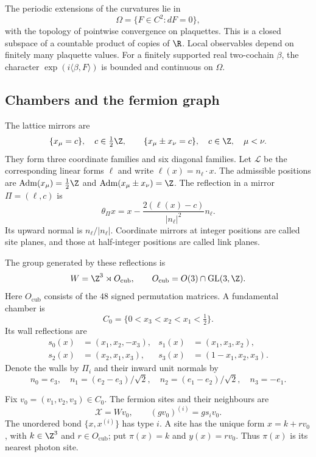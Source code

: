 The periodic extensions of the curvatures lie in
\[
 \Omega=\{F\in C^2:dF=0\},
\]
with the topology of pointwise convergence on plaquettes. This is a
closed subspace of a countable product of copies of $\R$. Local
observables depend on finitely many plaquette values. For a finitely
supported real two-cochain $\beta$, the character
$\exp(i\langle\beta,F\rangle)$ is bounded and continuous on $\Omega$.

\subsection{Chambers and the fermion graph}\label{subsec:reg-chambers}

The lattice mirrors are
\begin{equation}\label{eq:reg-mirrors}
 \{x_\mu=c\},\quad c\in\tfrac12\Z,
 \qquad
 \{x_\mu\pm x_\nu=c\},\quad c\in\Z,\quad\mu<\nu.
\end{equation}
They form three coordinate families and six diagonal families. Let
$\mathcal L$ be the corresponding linear forms $\ell$ and write
$\ell(x)=n_\ell\cdot x$. The admissible positions are
$\operatorname{Adm}(x_\mu)=\frac12\Z$ and
$\operatorname{Adm}(x_\mu\pm x_\nu)=\Z$. The reflection in a mirror
$\Pi=(\ell,c)$ is
\begin{equation}\label{eq:reg-reflection}
 \theta_\Pi x=x-\frac{2(\ell(x)-c)}{|n_\ell|^2}n_\ell.
\end{equation}
Its upward normal is $n_\ell/|n_\ell|$. Coordinate mirrors at integer
positions are called site planes, and those at half-integer positions
are called link planes.

The group generated by these reflections is
\[
 W=\Z^3\rtimes O_{\mathrm{cub}},
 \qquad O_{\mathrm{cub}}=O(3)\cap\operatorname{GL}(3,\Z).
\]
Here $O_{\mathrm{cub}}$ consists of the $48$ signed permutation matrices.
A fundamental chamber is
\[
 C_0=\{0<x_3<x_2<x_1<\tfrac12\}.
\]
Its wall reflections are
\begin{align*}
 s_0(x)&=(x_1,x_2,-x_3),&
 s_1(x)&=(x_1,x_3,x_2),\\
 s_2(x)&=(x_2,x_1,x_3),&
 s_3(x)&=(1-x_1,x_2,x_3).
\end{align*}
Denote the walls by $\Pi_i$ and their inward unit normals by
\begin{equation}\label{eq:reg-wall-normals}
 n_0=e_3,\quad n_1=(e_2-e_3)/\sqrt2,
 \quad n_2=(e_1-e_2)/\sqrt2,\quad n_3=-e_1.
\end{equation}

Fix $v_0=(v_1,v_2,v_3)\in C_0$. The fermion sites and their neighbours
are
\begin{equation}\label{eq:reg-fermion-sites}
 \mathcal X=Wv_0,\qquad (gv_0)^{(i)}=gs_iv_0.
\end{equation}
The unordered bond $\{x,x^{(i)}\}$ has type $i$. A site has the unique
form $x=k+rv_0$, with $k\in\Z^3$ and $r\in O_{\mathrm{cub}}$; put
$\pi(x)=k$ and $y(x)=rv_0$. Thus $\pi(x)$ is its nearest photon site.

